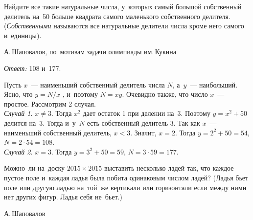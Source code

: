 \begin{problems}

\item
Найдите все такие натуральные числа, у~которых самый большой собственный
делитель на~50 больше квадрата самого маленького собственного делителя.
(\emph{Собственными} называются все натуральные делители числа кроме него самого
и~единицы).
\begingroup\em\small\par\strut\hfill
    А.\,Шаповалов, по~мотивам задачи олимпиады им.\,Кукина
\endgroup
\end{problems}

\ifincludesolutions
\emph{Ответ:} 108 и~177.
\par
Пусть $x$~— наименьший собственный делитель числа $N$, а~$y$~— наибольший.
Ясно, что $y = N / x$ , и~поэтому $N = x y$.
Очевидно также, что число $x$~— простое.
Рассмотрим 2 случая.
\\
\emph{Случай 1.} $x \neq 3$.
Тогда $x^2$ дает остаток 1 при делении на~3.
Поэтому $y = x^2 + 50$ делится на~3.
Тогда и~у~$N$ есть собственный делитель 3.
Так как $x$~— наименьший собственный делитель, $x < 3$.
Значит, $x = 2$.
Тогда $y = 2^2 + 50 = 54$, $N = 2 \cdot 54 = 108$.
\\
\emph{Случай 2.} $x = 3$.
Тогда $y = 3^2 + 50 = 59$, $N = 3 \cdot 59 = 177$.
\fi %

\begin{problems}

\item
Можно~ли на~доску $2015 \times 2015$ выставить несколько ладей так, что каждое
пустое поле и~каждая ладья была побита одинаковым числом ладей?
(Ладья бьет поле или другую ладью на~той~же вертикали или горизонтали если
между ними нет других фигур.
Ладья себя не~бьет.)
\begingroup\em\small\par\strut\hfill
    А.\,Шаповалов
\endgroup
\end{problems}

